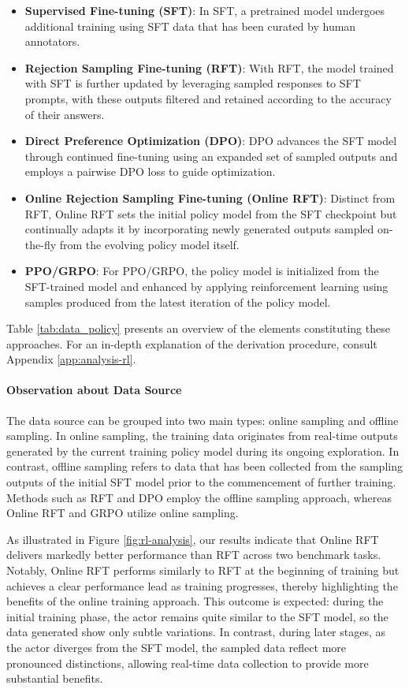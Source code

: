 \begin{itemize}[topsep=0pt]
\begin{itemize}[topsep=0pt]
\begin{itemize}
    \item \textbf{Supervised Fine-tuning (SFT)}: In SFT, a pretrained model undergoes additional training using SFT data that has been curated by human annotators.
    \item \textbf{Rejection Sampling Fine-tuning (RFT)}: With RFT, the model trained with SFT is further updated by leveraging sampled responses to SFT prompts, with these outputs filtered and retained according to the accuracy of their answers.
    \item \textbf{Direct Preference Optimization (DPO)}: DPO advances the SFT model through continued fine-tuning using an expanded set of sampled outputs and employs a pairwise DPO loss to guide optimization.
    \item \textbf{Online Rejection Sampling Fine-tuning (Online RFT)}: Distinct from RFT, Online RFT sets the initial policy model from the SFT checkpoint but continually adapts it by incorporating newly generated outputs sampled on-the-fly from the evolving policy model itself.
    \item \textbf{PPO/GRPO}: For PPO/GRPO, the policy model is initialized from the SFT-trained model and enhanced by applying reinforcement learning using samples produced from the latest iteration of the policy model.
\end{itemize}

Table \ref{tab:data_policy} presents an overview of the elements constituting these approaches. For an in-depth explanation of the derivation procedure, consult Appendix \ref{app:analysis-rl}.

\paragraph{Observation about Data Source} The data source can be grouped into two main types: online sampling and offline sampling. In online sampling, the training data originates from real-time outputs generated by the current training policy model during its ongoing exploration. In contrast, offline sampling refers to data that has been collected from the sampling outputs of the initial SFT model prior to the commencement of further training. Methods such as RFT and DPO employ the offline sampling approach, whereas Online RFT and GRPO utilize online sampling.

As illustrated in Figure \ref{fig:rl-analysis}, our results indicate that Online RFT delivers markedly better performance than RFT across two benchmark tasks. Notably, Online RFT performs similarly to RFT at the beginning of training but achieves a clear performance lead as training progresses, thereby highlighting the benefits of the online training approach. This outcome is expected: during the initial training phase, the actor remains quite similar to the SFT model, so the data generated show only subtle variations. In contrast, during later stages, as the actor diverges from the SFT model, the sampled data reflect more pronounced distinctions, allowing real-time data collection to provide more substantial benefits.


\end{itemize}
\end{itemize}
